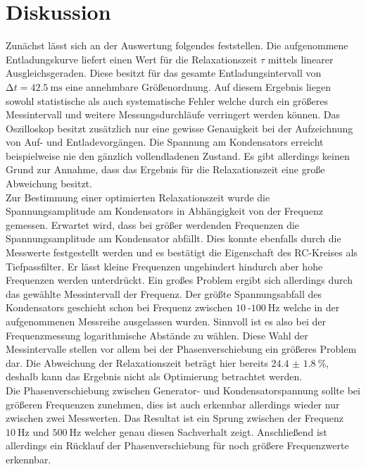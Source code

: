 \section{Diskussion}

Zunächst lässt sich an der Auswertung folgendes feststellen. Die aufgenommene Entladungskurve liefert einen Wert für die 
Relaxationszeit $\tau$ mittels linearer Ausgleichsgeraden. Diese besitzt für das gesamte Entladungsintervall von $\increment t = \SI{42.5}{\milli\second}$ eine annehmbare
Größenordnung. Auf diesem Ergebnis liegen sowohl statistische als auch systematische Fehler welche durch ein größeres Messintervall und weitere Messungsdurchläufe verringert werden 
können. Das Oszilloskop besitzt zusätzlich nur eine gewisse Genauigkeit bei der Aufzeichnung von Auf- und Entladevorgängen. Die Spannung am Kondensators erreicht beispielweise 
nie den gänzlich vollendladenen Zustand.
Es gibt allerdings keinen Grund zur Annahme, dass das Ergebnis für die Relaxationszeit eine große Abweichung besitzt.
\\
\newline
Zur Bestimmung einer optimierten Relaxationszeit wurde die Spannungsamplitude am Kondensators in Abhängigkeit von der Frequenz gemessen. 
Erwartet wird, dass bei größer werdenden Frequenzen die Spannungsamplitude am Kondensator abfällt.
Dies konnte ebenfalls durch die Messwerte festgestellt werden und es bestätigt die Eigenschaft des 
RC-Kreises als Tiefpassfilter. Er lässt kleine Frequenzen ungehindert hindurch aber hohe Frequenzen werden unterdrückt.
Ein großes Problem ergibt sich allerdings durch das gewählte Messintervall der Frequenz.
Der größte Spannungsabfall des Kondensators geschieht schon bei Frequenz zwischen $\SI{10}{}$-$\SI{100}{\hertz}$ welche in der aufgenommenen Messreihe ausgelassen wurden.
Sinnvoll ist es also bei der Frequenzmessung logarithmische Abstände zu wählen. Diese Wahl der Messintervalle stellen vor allem bei der Phasenverschiebung ein größeres Problem dar.
Die Abweichung der Relaxationszeit beträgt hier bereits $\SI{24.4(18)}{\percent}$, deshalb kann das Ergebnis nicht als Optimierung betrachtet werden.
\\
\newline
Die Phasenverschiebung zwischen Generator- und Kondensatorspannung sollte bei größeren Frequenzen zunehmen, dies ist auch erkennbar allerdings
wieder nur zwischen zwei Messwerten.
Das Resultat ist ein Sprung zwischen der Frequenz $\SI{10}{\hertz}$ 
und $\SI{500}{\hertz}$ welcher genau diesen Sachverhalt zeigt. Anschließend ist allerdings ein Rücklauf der Phasenverschiebung für noch größere Frequenzwerte erkennbar.
